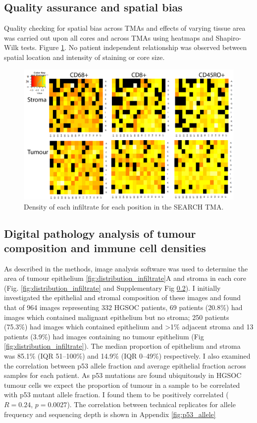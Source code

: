  \subsection{Quality assurance and spatial bias}
Quality checking for spatial bias across TMAs and effects of varying tissue area was carried out upon all cores and across TMAs using heatmaps and Shapiro-Wilk tests. Figure \ref{fig:heatmap}. No patient independent relationship was observed between spatial location and intensity of staining or core size. 

\begin{figure}
    \centering
    \includegraphics{Chapter2/Figs/Raster/Thesis-heatmap.png}
    \caption{Density of each infiltrate for each position in the SEARCH TMA.}
    \label{fig:heatmap}
\end{figure}


\subsection{Digital pathology analysis of tumour composition and immune cell densities}
As described in the methods, image analysis software was used to determine the area of tumour epithelium \ref{fig:distribution_infiltrate}A and stroma in each core (Fig. \ref{fig:distribution_infiltrate} and Supplementary Fig \ref{}). I initially investigated the epithelial and stromal composition of these images and found that of 964 images representing 332 HGSOC patients, 69 patients (20.8\%) had images which contained malignant epithelium but no stroma; 250 patients (75.3\%) had images which contained epithelium and >1\% adjacent stroma and 13 patients (3.9\%) had images containing no tumour epithelium (Fig \ref{fig:distribution_infiltrate}). The median proportion of epithelium and stroma was 85.1\% (IQR 51–100\%) and 14.9\% (IQR 0–49\%) respectively. 
I also examined the correlation between p53 allele fraction and average epithelial fraction across samples for each patient. As p53 mutations are found ubiquitously in HGSOC tumour cells we expect the proportion of tumour in a sample to be correlated with p53 mutant allele fraction. I found them to be positively correlated ($R= 0.24$, $p=0.0027$). The correlation between technical replicates for allele frequency and sequencing depth is shown in Appendix \ref{fig:p53_allele}


